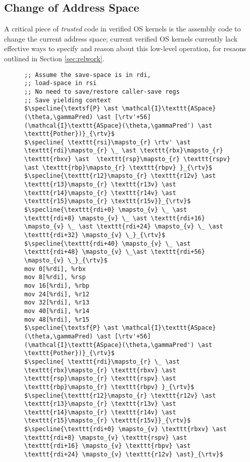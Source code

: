 \subsection{Change of Address Space}
A critical piece of \emph{trusted} code in verified OS kernels is the assembly code to change the current address space; current verified OS kernels currently lack effective ways to specify and reason about this low-level operation, for resaons outlined in Section \ref{sec:relwork}.
\begin{figure}\footnotesize
\begin{lstlisting}
;; Assume the save-space is in rdi,
;; load-space in rsi
;; No need to save/restore caller-save regs
;; Save yielding context
$\specline{\textsf{P} \ast \mathcal{I}\texttt{ASpace}(\theta,\gammaPred) \ast [\rtv'+56](\mathcal{I}\texttt{ASpace}(\theta,\gammaPred') \ast \texttt{Pother})}_{\rtv}$
$\specline{ \texttt{rsi}\mapsto_{r} \rtv' \ast \texttt{rdi}\mapsto_{r} \_ \ast \texttt{rbx}\mapsto_{r} \texttt{rbxv} \ast  \texttt{rsp}\mapsto_{r} \texttt{rspv} \ast \texttt{rbp}\mapsto_{r} \texttt{rbpv} }_{\rtv}$
$\specline{\texttt{r12}\mapsto_{r} \texttt{r12v} \ast \texttt{r13}\mapsto_{r} \texttt{r13v} \ast \texttt{r14}\mapsto_{r} \texttt{r14v} \ast \texttt{r15}\mapsto_{r} \texttt{r15v}}_{\rtv}$
$\specline{\texttt{rdi+0} \mapsto_{v} \_ \ast \texttt{rdi+8} \mapsto_{v} \_ \ast \texttt{rdi+16} \mapsto_{v} \_ \ast \texttt{rdi+24} \mapsto_{v} \_ \ast \texttt{rdi+32} \mapsto_{v} \_}_{\rtv}$
$\specline{\texttt{rdi+40} \mapsto_{v} \_ \ast \texttt{rdi+48} \mapsto_{v} \_\ast \texttt{rdi+56} \mapsto_{v} \_}_{\rtv}$
mov 0[%rdi], %rbx
mov 8[%rdi], %rsp
mov 16[%rdi], %rbp
mov 24[%rdi], %r12
mov 32[%rdi], %r13
mov 40[%rdi], %r14
mov 48[%rdi], %r15
$\specline{\textsf{P} \ast \mathcal{I}\texttt{ASpace}(\theta,\gammaPred) \ast [\rtv'+56](\mathcal{I}\texttt{ASpace}(\theta,\gammaPred') \ast \texttt{Pother})}_{\rtv}$
$\specline{ \texttt{rdi}\mapsto_{r} \_ \ast \texttt{rbx}\mapsto_{r} \texttt{rbxv} \ast  \texttt{rsp}\mapsto_{r} \texttt{rspv} \ast \texttt{rbp}\mapsto_{r} \texttt{rbpv} }_{\rtv}$
$\specline{\texttt{r12}\mapsto_{r} \texttt{r12v} \ast \texttt{r13}\mapsto_{r} \texttt{r13v} \ast \texttt{r14}\mapsto_{r} \texttt{r14v} \ast \texttt{r15}\mapsto_{r} \texttt{r15v}}_{\rtv}$
$\specline{\texttt{rdi+0} \mapsto_{v} \texttt{rbxv} \ast \texttt{rdi+8} \mapsto_{v} \texttt{rspv} \ast \texttt{rdi+16} \mapsto_{v} \texttt{rbpv} \ast \texttt{rdi+24} \mapsto_{v} \texttt{r12v} \ast}_{\rtv}$

\end{lstlisting}
\end{figure}
